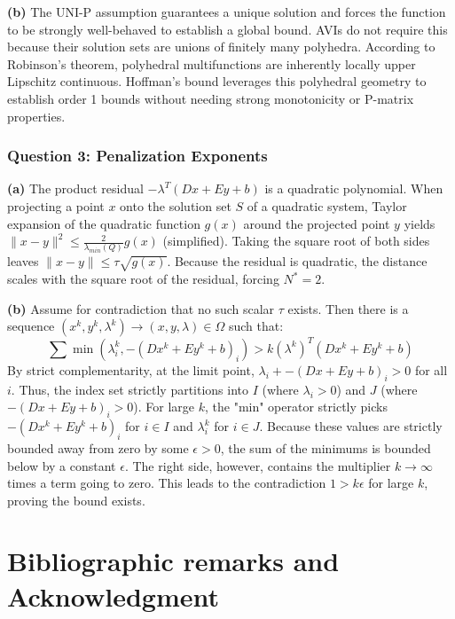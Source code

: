 \documentclass[pdflatex,sn-mathphys-num]{sn-jnl}%
\theoremstyle{definition}
\begin{document}
\textbf{(b)} The UNI-P assumption guarantees a unique solution and forces the function to be strongly well-behaved to establish a global bound. AVIs do not require this because their solution sets are unions of finitely many polyhedra. According to Robinson's theorem, polyhedral multifunctions are inherently locally upper Lipschitz continuous. Hoffman's bound leverages this polyhedral geometry to establish order 1 bounds without needing strong monotonicity or P-matrix properties.

\subsubsection{Question 3: Penalization Exponents}
\textbf{(a)} The product residual $-\lambda^T(Dx + Ey + b)$ is a quadratic polynomial. When projecting a point $x$ onto the solution set $S$ of a quadratic system, Taylor expansion of the quadratic function $g(x)$ around the projected point $y$ yields $\|x - y\|^2 \le \frac{2}{\lambda_{min}(Q)} g(x)$ (simplified). Taking the square root of both sides leaves $\|x - y\| \le \tau \sqrt{g(x)}$. Because the residual is quadratic, the distance scales with the square root of the residual, forcing $N^* = 2$.

\textbf{(b)} Assume for contradiction that no such scalar $\tau$ exists. Then there is a sequence $(x^k, y^k, \lambda^k) \to (x, y, \lambda) \in \Omega$ such that:
$$ \sum \min(\lambda_i^k, -(Dx^k + Ey^k + b)_i) > k (\lambda^k)^T(Dx^k + Ey^k + b) $$
By strict complementarity, at the limit point, $\lambda_i + -(Dx + Ey + b)_i > 0$ for all $i$. Thus, the index set strictly partitions into $I$ (where $\lambda_i > 0$) and $J$ (where $-(Dx + Ey + b)_i > 0$). 
For large $k$, the "min" operator strictly picks $-(Dx^k + Ey^k + b)_i$ for $i \in I$ and $\lambda_i^k$ for $i \in J$. Because these values are strictly bounded away from zero by some $\epsilon > 0$, the sum of the minimums is bounded below by a constant $\epsilon$. The right side, however, contains the multiplier $k \to \infty$ times a term going to zero. This leads to the contradiction $1 > k \epsilon$ for large $k$, proving the bound exists.

\section{Bibliographic remarks and Acknowledgment}
\end{document}
